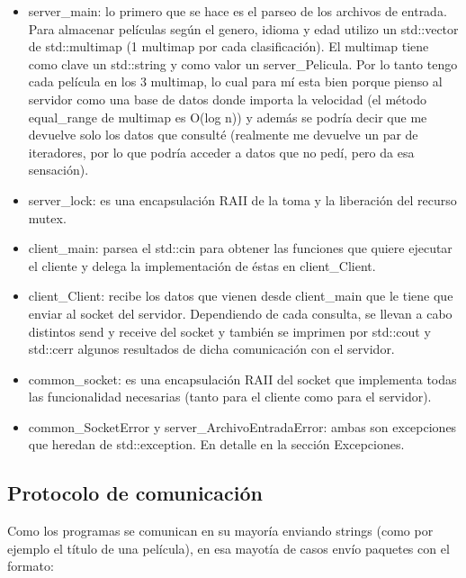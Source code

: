 \documentclass[a4paper,12pt]{report}
\begin{document}
\begin{itemize}
\item server\_main: lo primero que se hace es el parseo de los archivos de entrada. Para almacenar pel\'iculas seg\'un el genero, idioma y edad utilizo un std::vector de std::multimap (1 multimap por cada clasificaci\'on). El multimap tiene como clave un std::string y como valor un server\_Pelicula. Por lo tanto tengo cada pel\'icula en los 3 multimap, lo cual para m\'i esta bien porque pienso al servidor como una base de datos donde importa la velocidad (el m\'etodo equal\_range de multimap es O(log n)) y adem\'as se podr\'ia decir que me devuelve solo los datos que consult\'e (realmente me devuelve un par de iteradores, por lo que podr\'ia acceder a datos que no ped\'i, pero da esa sensaci\'on).

\item server\_lock: es una encapsulaci\'on RAII de la toma y la liberaci\'on del recurso mutex.

\item client\_main: parsea el std::cin para obtener las funciones que quiere ejecutar el cliente y delega la implementaci\'on de \'estas en client\_Client.

\item client\_Client: recibe los datos que vienen desde client\_main que le tiene que enviar al socket del servidor. Dependiendo de cada consulta, se llevan a cabo distintos send y receive del socket y tambi\'en se imprimen por std::cout y std::cerr algunos resultados de dicha comunicaci\'on con el servidor. 

\item common\_socket: es una encapsulaci\'on RAII del socket que implementa todas las funcionalidad necesarias (tanto para el cliente como para el servidor).

\item common\_SocketError y server\_ArchivoEntradaError: ambas son excepciones que heredan de std::exception. En detalle en la secci\'on Excepciones.

\end{itemize}

\subsection{Protocolo de comunicaci\'on}

Como los programas se comunican en su mayor\'ia enviando strings (como por ejemplo el t\'itulo de una pel\'icula), en esa mayot\'ia de casos env\'io paquetes con el formato:
\end{document}
